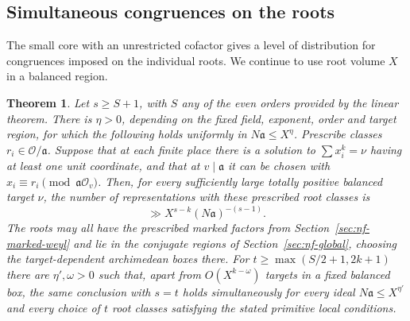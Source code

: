 \documentclass[11pt,letterpaper]{article}
\newtheorem{theorem}{Theorem}[section]
\theoremstyle{definition}
\numberwithin{equation}{section}
\begin{document}
\subsection{Simultaneous congruences on the roots}
\label{sec:nf-strong-approximation}
The small core with an unrestricted cofactor gives a level of
distribution for congruences imposed on the individual roots. We
continue to use root volume $X$ in a balanced region.

\begin{theorem}\label{thm:nf-strong-approximation}
Let $s\ge S+1$, with $S$ any of the even orders provided by the
linear theorem. There is $\eta>0$, depending on the fixed field,
exponent, order and target region, for which the following holds
uniformly in $N\mathfrak a\le X^\eta$. Prescribe classes
$r_i\in\mathcal O/\mathfrak a$. Suppose that at each finite place
there is a solution to $\sum x_i^k=\nu$ having at least one unit
coordinate, and that at $v\mid\mathfrak a$ it can be chosen with
$x_i\equiv r_i\pmod{\mathfrak a\mathcal O_v}$. Then, for every
sufficiently large totally positive balanced target $\nu$, the
number of representations with these prescribed root classes is
\[
                 \gg X^{s-k}(N\mathfrak a)^{-(s-1)} .
\]
The roots may all have the prescribed marked factors from
Section~\ref{sec:nf-marked-weyl} and lie in the conjugate regions
of Section~\ref{sec:nf-global}, choosing the target-dependent
archimedean boxes there. For
$t\ge\max(S/2+1,2k+1)$ there are $\eta',\omega>0$ such that,
apart from $O(X^{k-\omega})$ targets in a fixed balanced box, the
same conclusion with $s=t$ holds simultaneously for every ideal
$N\mathfrak a\le X^{\eta'}$ and every choice of $t$ root classes
satisfying the stated primitive local conditions.
\end{theorem}
\end{document}
